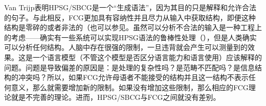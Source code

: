 Van Trijp表明HPSG/SBCG是一个“生成语法”，因为其目的只是解释和允许合法的句子。与此相反，FCG更加具有容纳性并且尽力从输入中获取结构，即便这种结构是零碎的或者非法的（也可以参见\citealp[]{Steels2013a}。虽然可以分析不合法的输入是一种工程上的考虑——确实有一些系统可以实现HPSG语法的鲁棒性处理（\citep*{KKN2000a-u,Copestake2007a-u}），但是人类确实可以分析任何结构。人脑中存在很强的限制，一旦违背就会产生可以测量到的效果。这是一个语言模型（不管这个模型是否区分语言能力和语言使用）应该解释的问题。问题是导致偏差的原因是：是处理的复杂性吗？是范畴不匹配吗？是信息结构的冲突吗？所以，如果FCG允许母语者不能接受的结构并且这一结构不表示任何意义，那么就需要增加新的限制。如果没有增加这些限制，那么相应的FCG理论就是不完善的理论。进而，HPSG/SBCG与FCG之间就没有差别。


